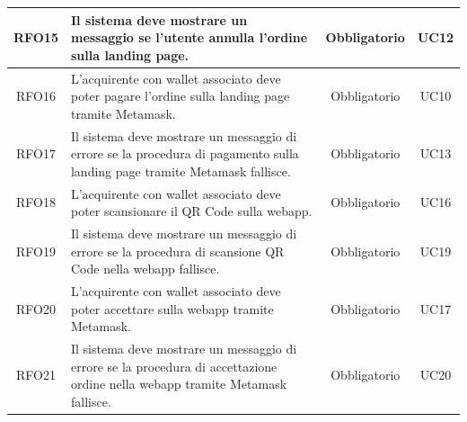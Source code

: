 \documentclass[a4paper, 12pt]{article}
\begin{document}
\begin{longtable}{|c|p{5cm}|c|c|}
RFO15 & Il sistema deve mostrare un messaggio se l'utente annulla l'ordine sulla landing page. & Obbligatorio & UC12 \\
\hline
RFO16 & L'acquirente con wallet associato deve poter pagare l'ordine sulla landing page tramite Metamask. & Obbligatorio & UC10 \\
\hline
RFO17 & Il sistema deve mostrare un messaggio di errore se la procedura di pagamento sulla landing page tramite Metamask fallisce. & Obbligatorio & UC13 \\
\hline
RFO18 & L'acquirente con wallet associato deve poter scansionare il QR Code sulla webapp. & Obbligatorio & UC16 \\
\hline
RFO19 & Il sistema deve mostrare un messaggio di errore se la procedura di scansione QR Code nella webapp fallisce. & Obbligatorio & UC19 \\
\hline
RFO20 & L'acquirente con wallet associato deve poter accettare sulla webapp tramite Metamask. & Obbligatorio & UC17 \\
\hline
RFO21 & Il sistema deve mostrare un messaggio di errore se la procedura di accettazione ordine nella webapp tramite Metamask fallisce. & Obbligatorio & UC20 \\
\hline

\end{longtable}
\pagebreak
\end{document}
